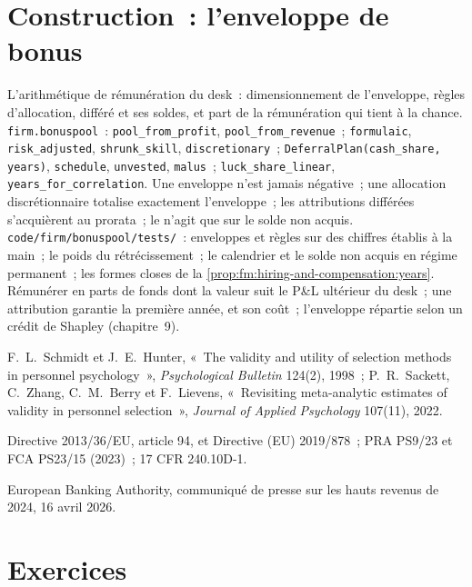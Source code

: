 \section{Construction~: l'enveloppe de bonus}\label{bld:fm:hiring-and-compensation:bonuspool}

\begin{build}
 L'arithmétique de rémunération du desk~: dimensionnement de l'enveloppe, règles d'allocation, différé et ses soldes, et part de la rémunération qui tient à la chance.
 \texttt{firm.bonuspool}~: \texttt{pool\_from\_profit}, \texttt{pool\_from\_revenue}~; \texttt{formulaic}, \texttt{risk\_adjusted},
\texttt{shrunk\_skill}, \texttt{discretionary}~; \texttt{DeferralPlan(cash\_share, years)}, \texttt{schedule}, \texttt{unvested}, \texttt{malus}~;
\texttt{luck\_share\_linear}, \texttt{years\_for\_correlation}.
 Une enveloppe n'est jamais négative~; une allocation discrétionnaire totalise exactement l'enveloppe~; les attributions différées s'acquièrent au prorata~; le  n'agit que sur le
solde non acquis.
 \texttt{code/firm/bonuspool/tests/}~: enveloppes et règles sur des chiffres établis à la main~; le poids du rétrécissement~; le calendrier et le
solde non acquis en régime permanent~; les formes closes de la \cref{prop:fm:hiring-and-compensation:years}.
 Rémunérer en parts de fonds dont la valeur suit le P\&L ultérieur du desk~; une attribution garantie la première année, et son coût~; l'enveloppe répartie
selon un crédit de Shapley (chapitre~9).
\end{build}

\begin{omsources}
\item F.~L.~Schmidt et J.~E.~Hunter, «~The validity and utility of selection methods in personnel psychology~», \emph{Psychological Bulletin}
124(2), 1998~; P.~R.~Sackett, C.~Zhang, C.~M.~Berry et F.~Lievens, «~Revisiting meta-analytic estimates of validity in personnel selection~»,
\emph{Journal of Applied Psychology} 107(11), 2022.
\item Directive 2013/36/EU, article 94, et Directive (EU) 2019/878~; PRA PS9/23 et FCA PS23/15 (2023)~; 17 CFR 240.10D-1.
\item European Banking Authority, communiqué de presse sur les hauts revenus de 2024, 16 avril 2026.
\end{omsources}

\section{Exercices}

